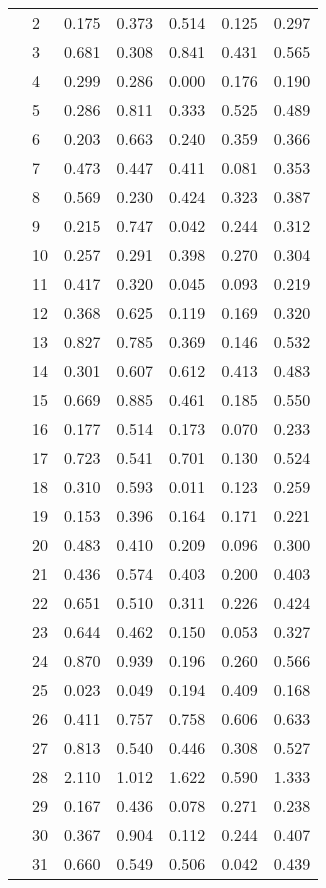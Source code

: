 \begin{table}
\begin{tabular}{llrrrrr}
 & 2 & 0.175 & 0.373 & 0.514 & 0.125 & 0.297 \\
 & 3 & 0.681 & 0.308 & 0.841 & 0.431 & 0.565 \\
 & 4 & 0.299 & 0.286 & 0.000 & 0.176 & 0.190 \\
 & 5 & 0.286 & 0.811 & 0.333 & 0.525 & 0.489 \\
 & 6 & 0.203 & 0.663 & 0.240 & 0.359 & 0.366 \\
 & 7 & 0.473 & 0.447 & 0.411 & 0.081 & 0.353 \\
 & 8 & 0.569 & 0.230 & 0.424 & 0.323 & 0.387 \\
 & 9 & 0.215 & 0.747 & 0.042 & 0.244 & 0.312 \\
 & 10 & 0.257 & 0.291 & 0.398 & 0.270 & 0.304 \\
 & 11 & 0.417 & 0.320 & 0.045 & 0.093 & 0.219 \\
 & 12 & 0.368 & 0.625 & 0.119 & 0.169 & 0.320 \\
 & 13 & 0.827 & 0.785 & 0.369 & 0.146 & 0.532 \\
 & 14 & 0.301 & 0.607 & 0.612 & 0.413 & 0.483 \\
 & 15 & 0.669 & 0.885 & 0.461 & 0.185 & 0.550 \\
 & 16 & 0.177 & 0.514 & 0.173 & 0.070 & 0.233 \\
 & 17 & 0.723 & 0.541 & 0.701 & 0.130 & 0.524 \\
 & 18 & 0.310 & 0.593 & 0.011 & 0.123 & 0.259 \\
 & 19 & 0.153 & 0.396 & 0.164 & 0.171 & 0.221 \\
 & 20 & 0.483 & 0.410 & 0.209 & 0.096 & 0.300 \\
 & 21 & 0.436 & 0.574 & 0.403 & 0.200 & 0.403 \\
 & 22 & 0.651 & 0.510 & 0.311 & 0.226 & 0.424 \\
 & 23 & 0.644 & 0.462 & 0.150 & 0.053 & 0.327 \\
 & 24 & 0.870 & 0.939 & 0.196 & 0.260 & 0.566 \\
 & 25 & 0.023 & 0.049 & 0.194 & 0.409 & 0.168 \\
 & 26 & 0.411 & 0.757 & 0.758 & 0.606 & 0.633 \\
 & 27 & 0.813 & 0.540 & 0.446 & 0.308 & 0.527 \\
 & 28 & 2.110 & 1.012 & 1.622 & 0.590 & 1.333 \\
 & 29 & 0.167 & 0.436 & 0.078 & 0.271 & 0.238 \\
 & 30 & 0.367 & 0.904 & 0.112 & 0.244 & 0.407 \\
 & 31 & 0.660 & 0.549 & 0.506 & 0.042 & 0.439 \\

\end{tabular}
\end{table}
